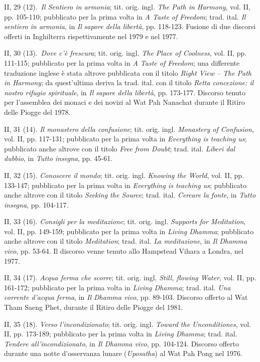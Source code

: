 II, 29 (12).~\emph{Il Sentiero in armonia}; tit. orig. ingl. \emph{The
Path in Harmony}, vol. II, pp. 105-110; pubblicato per la prima volta in
\emph{A Taste of Freedom}; trad. ital. \emph{Il sentiero in armonia}, in
\emph{Il} \emph{sapore della libertà}, pp. 118-123. Fusione di due
discorsi offerti in Inghilterra rispettivamente nel 1979 e nel 1977.

II, 30 (13).~\emph{Dove c'è frescura}; tit. orig. ingl. \emph{The Place
of Coolness}, vol. II, pp. 111-115; pubblicato per la prima volta in
\emph{A Taste of Freedom}; una differente traduzione inglese è stata
altrove pubblicata con il titolo \emph{Right View -- The Path in
Harmony}; da quest'ultima deriva la trad. ital. con il titolo
\emph{Retta concezione: il nostro rifugio spirituale}, in \emph{Il}
\emph{sapore della libertà}, pp. 173-177. Discorso tenuto per
l'assemblea dei monaci e dei novizi al Wat Pah Nanachat durante il
Ritiro delle Piogge del 1978.

II, 31 (14). \emph{Il monastero della confusione}; tit. orig. ingl.
\emph{Monastery of Confusion}, vol. II, pp. 117-131; pubblicato per la
prima volta in \emph{Everything is teaching us}; pubblicato anche
altrove con il titolo \emph{Free from Doubt}; trad. ital. \emph{Liberi
dal dubbio}, in \emph{Tutto insegna}, pp. 45-61.

II, 32 (15). \emph{Conoscere il mondo}; tit. orig. ingl. \emph{Knowing
the World}, vol. II, pp. 133-147; pubblicato per la prima volta in
\emph{Everything is teaching us}; pubblicato anche altrove con il titolo
\emph{Seeking the Source}; trad. ital. \emph{Cercare la fonte}, in
\emph{Tutto insegna}, pp. 104-117\emph{.}

II, 33 (16). \emph{Consigli per la meditazione}; tit. orig. ingl.
\emph{Supports for Meditation}, vol. II, pp. 149-159; pubblicato per la
prima volta in \emph{Living Dhamma}; pubblicato anche altrove con il
titolo \emph{Meditation}; trad. ital. \emph{La meditazione}, in \emph{Il
Dhamma vivo}, pp. 53-64. Il discorso venne tenuto allo Hampstead Vihara
a Londra, nel 1977.

II, 34 (17). \emph{Acqua ferma che scorre}; tit. orig. ingl.
\emph{Still, flowing Water}, vol. II, pp. 161-172; pubblicato per la
prima volta in \emph{Living Dhamma}; trad. ital. \emph{Una corrente
d'acqua ferma}, in \emph{Il Dhamma vivo}, pp. 89-103. Discorso offerto
al Wat Tham Saeng Phet, durante il Ritiro delle Piogge del 1981.

II, 35 (18). \emph{Verso l'incondizionato}; tit. orig. ingl.
\emph{Toward the Unconditiones}, vol. II, pp. 173-189; pubblicato per la
prima volta in \emph{Living Dhamma}; trad. ital. \emph{Tendere
all'incondizionato}, in \emph{Il Dhamma vivo}, pp. 104-124. Discorso
offerto durante una notte d'osservanza lunare (\emph{Uposatha}) al Wat
Pah Pong nel 1976.

